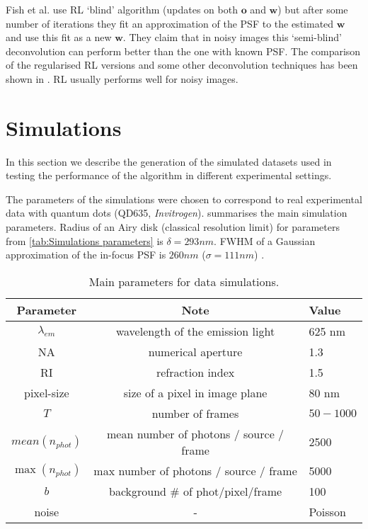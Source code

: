 Fish et al. \cite{Fish1995} use RL `blind' algorithm (updates on both $\bm{o}$ and $\bm{w}$) but after some number of iterations they fit an approximation of the PSF to the estimated $\bm{w}$ and use this fit as a new $\bm{w}$. They claim that in noisy images this `semi-blind' deconvolution can perform better than the one with known PSF. The comparison of the regularised RL versions and some other deconvolution techniques has been shown in \cite{Kempen1997BA,Verveer1999}. RL usually performs well for noisy images.


\clearpage
\section{Simulations \label{sec:simulations}}
In this section we describe the generation of the simulated datasets used in testing the performance of the algorithm in different experimental settings.

The parameters of the simulations were chosen to correspond to real experimental data with quantum dots (QD635, \emph{Invitrogen}).   summarises the main simulation parameters. Radius of an Airy disk (classical resolution limit) for parameters from \autoref{tab:Simulations parameters} is $\delta=293 \unit{nm}$. FWHM of a Gaussian approximation of the in-focus PSF is $260\unit{nm}$ ($\sigma = 111\unit{nm}$) \cite{Zhang2007}.
%
\begin{table}[!h]
	\centering
	\begin{tabular}{|c|c|l|}
		\hline 
		\bf Parameter 		& \bf Note  							& \bf Value\tabularnewline
		\hline %
		$\lambda_{em}$ 	& wavelength of the emission light 	& 625 nm\tabularnewline
		NA 				& numerical aperture 				& 1.3\tabularnewline
		RI 				& refraction index 					& 1.5\tabularnewline
		pixel-size 			& size of a pixel in image plane	& 80 nm\tabularnewline
		$T$ 				& number of frames  					& $50-1000$\tabularnewline
		$\unit{mean}(n_{phot})$ & mean number of photons / source / frame 	& 2500\tabularnewline
		$\max(n_{phot})$ 	& max number of photons / source / frame 	& 5000\tabularnewline
		$b$ 				& background \# of phot/pixel/frame 			& 100\tabularnewline
		noise			& 	{\centering -}				& Poisson\tabularnewline
		\hline
	\end{tabular}
	\caption{Main parameters for data simulations.}
	\label{tab:Simulations parameters}
\end{table}

